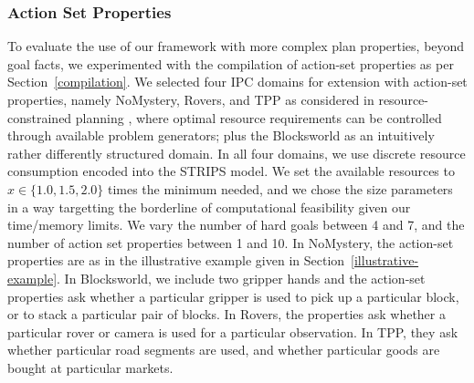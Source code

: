 %









\subsubsection*{Action Set Properties}

To evaluate the use of our framework with more complex plan
properties, beyond goal facts, we experimented with the compilation of
action-set properties as per Section~\ref{compilation}. We selected
four IPC domains for extension with action-set properties, namely
NoMystery, Rovers, and TPP as considered in resource-constrained
planning \cite{nakhost:etal:icaps-12}, where optimal resource
requirements can be controlled through available problem generators;
plus the Blocksworld as an intuitively rather differently structured
domain. In all four domains, we use discrete resource consumption
encoded into the STRIPS model. We set the available resources to
$x \in \{1.0,1.5, 2.0\}$ times the minimum needed, and we chose the
size parameters in a way targetting the borderline of computational
feasibility given our time/memory limits. We vary the number of hard
goals between 4 and 7, and the number of action set properties between
1 and 10. In NoMystery, the action-set properties are as in the
illustrative example given in Section~\ref{illustrative-example}. In
Blocksworld, we include two gripper hands and the action-set
properties ask whether a particular gripper is used to pick up a
particular block, or to stack a particular pair of blocks. In Rovers,
the properties ask whether a particular rover or camera is used for a
particular observation. In TPP, they ask whether particular road
segments are used, and whether particular goods are bought at
particular markets.

